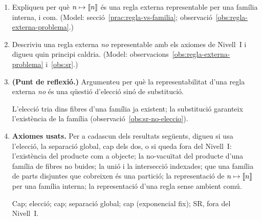 \begin{enumerate}[resume]
  \item Expliqueu per què \(n\mapsto\llbracket n\rrbracket\) és una regla externa representable per una família interna, i com. (Model: secció~\ref{prac:regla-vs-familia}; observació~\ref{obs:regla-externa-problema}.)

  \item Descriviu una regla externa \emph{no} representable amb els axiomes de Nivell~I i digueu quin principi caldria. (Model: observacions~\ref{obs:regla-externa-problema} i~\ref{obs:sr}.)

  \item \textbf{(Punt de reflexió.)} Argumenteu per què la representabilitat d'una regla externa \emph{no} és una qüestió d'elecció sinó de substitució. \begin{indicacio}L'elecció tria dins fibres d'una família ja existent; la substitució garanteix l'existència de la família (observació~\ref{obs:sr-no-eleccio}).\end{indicacio}

  \item \textbf{Axiomes usats.} Per a cadascun dels resultats següents, digueu si usa l'elecció, la separació global, cap dels dos, o si queda fora del Nivell~I: l'existència del producte com a objecte; la no-vacuïtat del producte d'una família de fibres no buides; la unió i la intersecció indexades; que una família de parts disjuntes que cobreixen és una partició; la representació de \(n\mapsto\llbracket n\rrbracket\) per una família interna; la representació d'una regla sense ambient comú. \begin{indicacio}Cap; elecció; cap; separació global; cap (exponencial fix); SR, fora del Nivell~I.\end{indicacio}
\end{enumerate}
